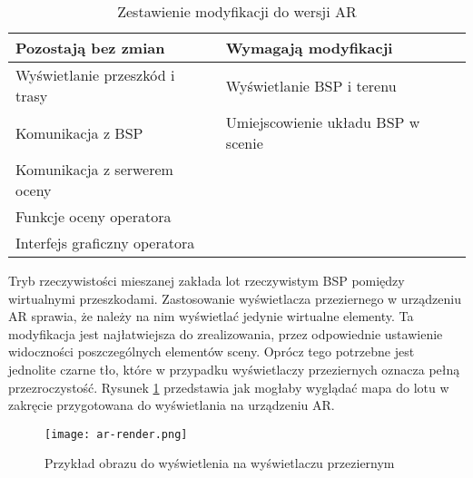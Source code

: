 \begin{table}[!h] \centering
    \caption{Zestawienie modyfikacji do wersji AR}
    \label{tab:modyfikacje-ar}

    \begin{tabular} {| l | l |} \hline
        \textbf{Pozostają bez zmian} & \textbf{Wymagają modyfikacji} \\ \hline\hline
        Wyświetlanie przeszkód i trasy & Wyświetlanie BSP i terenu \\ \hline
        Komunikacja z BSP & Umiejscowienie układu BSP w scenie \\ \hline
        Komunikacja z serwerem oceny &  \\ \hline
        Funkcje oceny operatora &  \\ \hline
        Interfejs graficzny operatora &  \\ \hline
    \end{tabular}
\end{table}

Tryb rzeczywistości mieszanej zakłada lot rzeczywistym BSP pomiędzy wirtualnymi przeszkodami. Zastosowanie wyświetlacza przeziernego w urządzeniu AR sprawia, że należy na nim wyświetlać jedynie wirtualne elementy. Ta modyfikacja jest najłatwiejsza do zrealizowania, przez odpowiednie ustawienie widoczności poszczególnych elementów sceny. Oprócz tego potrzebne jest jednolite czarne tło, które w przypadku wyświetlaczy przeziernych oznacza pełną przezroczystość. Rysunek \ref{fig:ar-render} przedstawia jak mogłaby wyglądać mapa do lotu w zakręcie przygotowana do wyświetlania na urządzeniu AR.

\begin{figure}[!h]
    \centering \texttt{[image: ar-render.png]}
    \caption{Przykład obrazu do wyświetlenia na wyświetlaczu przeziernym}
    \label{fig:ar-render}
\end{figure}

